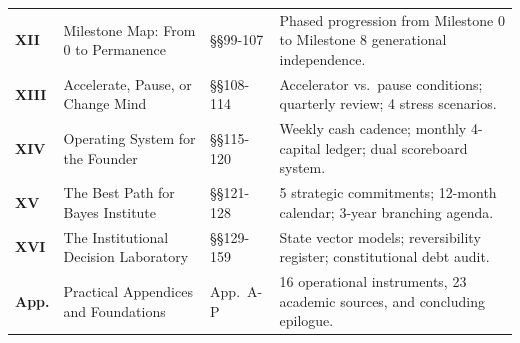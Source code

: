 \begin{table}[t]
\begin{tabularx}{\textwidth}{p{1.2cm} p{4.2cm} p{1.6cm} X}
\textbf{XII} & Milestone Map: From 0 to Permanence & \S\S 99-107 & Phased progression from Milestone 0 to Milestone 8 generational independence. \\
\textbf{XIII} & Accelerate, Pause, or Change Mind & \S\S 108-114 & Accelerator vs.\ pause conditions; quarterly review; 4 stress scenarios. \\
\textbf{XIV} & Operating System for the Founder & \S\S 115-120 & Weekly cash cadence; monthly 4-capital ledger; dual scoreboard system. \\
\textbf{XV} & The Best Path for Bayes Institute & \S\S 121-128 & 5 strategic commitments; 12-month calendar; 3-year branching agenda. \\
\textbf{XVI} & The Institutional Decision Laboratory & \S\S 129-159 & State vector models; reversibility register; constitutional debt audit. \\
\textbf{App.} & Practical Appendices and Foundations & App.\ A-P & 16 operational instruments, 23 academic sources, and concluding epilogue. \\
\bottomrule
\end{tabularx}
\end{table}


